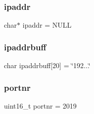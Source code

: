\mbox{\label{client_2main_8c_ad540706412769097e113feb208f0b6bf}} 
\subsubsection{ipaddr}
{\footnotesize\ttfamily char$\ast$ ipaddr = N\+U\+LL}

\mbox{\label{client_2main_8c_a8d57647647f5833d4b1fd30627072575}} 
\subsubsection{ipaddrbuff}
{\footnotesize\ttfamily char ipaddrbuff[20] = \char`\"{}192...\char`\"{}}

\mbox{\label{client_2main_8c_a10fff5773beb16729c478f6d20e5d986}} 
\subsubsection{portnr}
{\footnotesize\ttfamily uint16\+\_\+t portnr = 2019}

